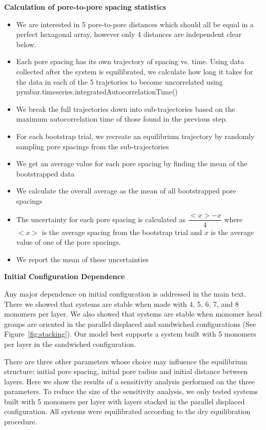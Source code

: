 \documentclass{article}
\begin{document}
  \textbf{Calculation of pore-to-pore spacing statistics}
  
  \color{red}{This is an outline of this section and will be reworded for clarity}
  \begin{itemize}
  	\item We are interested in 5 pore-to-pore distances which should all
	be equal in a perfect hexagonal array, however only 4 distances are independent
	clear below.
	\item Each pore spacing has its own trajectory of spacing vs. time.
	Using data collected after the system is equilibrated, we calculate how long it
	takes for the data in each of the 5 trajetories to become uncorrelated using
	pymbar.timeseries.integratedAutocorrelationTime() %
	\item We break the full trajectories down into sub-trajectories based
	on the maximum autocorrelation time of those found in the previous step.
	\item For each bootstrap trial, we recreate an equilibrium trajectory
	by randomly sampling pore spacings from the sub-trajectories 
	\item We get an average value for each pore spacing by finding the
	mean of the bootstrapped data
	\item We calculate the overall average as the mean of all
	bootstrapped pore spacings
	\item The uncertainty for each pore spacing is calculated as
	$\dfrac{<x> - x}{4}$ where $<x>$ is the average spacing from the bootstrap
	trial and $x$ is the average value of one of the pore spacings.
	\item We report the mean of these uncertainties
  \end{itemize}

  \begingroup
	\fontsize{14pt}{12pt}\selectfont
	\textbf{Initial Configuration Dependence}
  \endgroup

  Any major dependence on initial configuration is addressed in the main text.
  There we showed that systems are stable when made with 4, 5, 6, 7, and 8
  monomers per layer. We also showed that systems are stable when monomer head
  groups are oriented in the parallel displaced and sandwiched configurations
  (See Figure~\ref{fig:stacking}). Our model best supports a system built with 5
  monomers per layer in the sandwiched configuration. 

  There are three other parameters whose choice may influence the equilibrium
  structure: initial pore spacing, initial pore radius and initial distance
  between layers. Here we show the results of a sensitivity analysis performed
  on the three parameters. To reduce the size of the sensitivity analysis, we
  only tested systems built with 5 monomers per layer with layers stacked in 
  the parallel displaced configuration. All systems were equilibrated according
  to the dry equilibration procedure.
\end{document}
